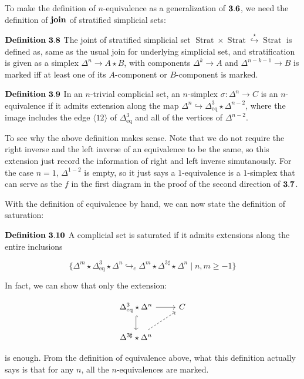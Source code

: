 \documentclass[11pt]{article}
\DeclareMathOperator{\Strat}{Strat}
\DeclareMathOperator{\eq}{eq}
\begin{document}
To make the definition of $n$-equivalence as a generalization of $\bf 3.6$, we need the definition of $\bf join$ of stratified simplicial sets:

$\bf Definition \ 3.8$ The joint of stratified simplicial set $\Strat\times\Strat\overset{\star}\hookrightarrow\Strat$ is defined as, same as the usual join for underlying simplicial set, and stratification is given as a simplex $\Delta^n\to A\star B$, with components $\Delta^k\to A$ and $\Delta^{n-k-1}\to B$ is marked iff at least one of its $A$-component or $B$-component is marked.

$\bf Definition \ 3.9$ In an $n$-trivial complicial set, an $n$-simplex $\sigma:\Delta^n\to C$ is an $n$-equivalence if it admits extension along the map $\Delta^n\hookrightarrow\Delta^3_{\eq}\star \Delta^{n-2}$, where the image includes the edge $\langle 12\rangle$ of $\Delta^3_{\eq}$ and all of the vertices of $\Delta^{n-2}$.

To see why the above definition makes sense. Note that we do not require the right inverse and the left inverse of an equivalence to be the same, so this extension just record the information of right and left inverse simutanously. For the case $n=1$, $\Delta^{1-2}$ is empty, so it just says a $1$-equivalence is a $1$-simplex that can serve as the $f$ in the first diagram in the proof of the second direction of $\bf 3.7$. 

With the definition of equivalence by hand, we can now state the definition of saturation:

$\bf Definition \ 3.10$ A complicial set is saturated if it admits extensions along the entire inclusions

$$\{\Delta^m\star \Delta^3_{\eq}\star \Delta^n\hookrightarrow_e \Delta^m\star\Delta^{3\sharp}\star\Delta^n\mid n,m\ge -1 \}$$

In fact, we can show that only the extension:


$$\begin{tikzcd}
\Delta^3_{\eq}\star\Delta^n \arrow[d, hook] \arrow[r, rightarrow]
& C \\
\Delta^{3\sharp}\star\Delta^n\arrow[ur, dashrightarrow]
\end{tikzcd}$$

is enough. From the definition of equivalence above, what this definition actually says is that for any $n$, all the $n$-equivalences are marked.
\end{document}
